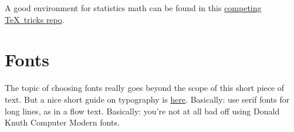 \documentclass{article}
\begin{document}
A good environment for statistics math can be found in this \href{https://github.com/msoelch/tex}{competing \TeX\ tricks repo}.


\section{Fonts}
The topic of choosing fonts really goes beyond the scope of this short piece of text.
But a nice short guide on typography is 
\href{https://www.pierrickcalvez.com/journal/a-five-minutes-guide-to-better-typography}{here}.
Basically: use serif fonts for long lines, as in a flow text.  
Basically: you're not at all bad off using Donald Knuth Computer Modern fonts.


 
\end{document}
